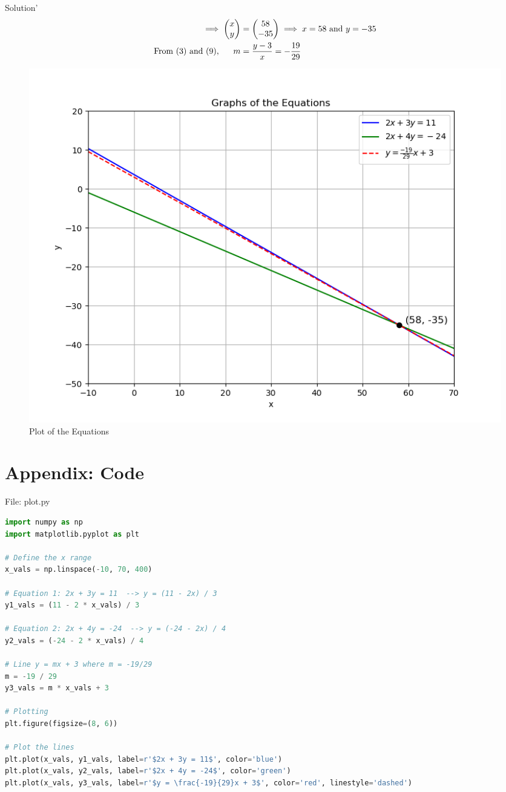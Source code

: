 \documentclass{beamer}
\numberwithin{equation}{section}
\theoremstyle{remark}
\newcommand{\myvec}[1]{\ensuremath{\begin{pmatrix}#1\end{pmatrix}}}
\begin{document}
\begin{frame}{Solution}'
\begin{align}
    \implies \myvec{x\\y} &= \myvec{58\\-35} \implies x = 58 \text{ and } y = -35 \\
    \text{From (3) and (9),}\hspace{0.6cm}m &= \frac{y - 3}{x} = -\frac{19}{29}
\end{align}
\begin{figure}[h!]
   \centering
   \includegraphics[width=0.64\linewidth]{figs/01.png}
   \caption{Plot of the Equations}
   \label{Plot_1}
\end{figure}
\end{frame}
\section*{Appendix: Code}
\begin{frame}[fragile]{File: plot.py}
\begin{lstlisting}[language=Python]
import numpy as np
import matplotlib.pyplot as plt

# Define the x range
x_vals = np.linspace(-10, 70, 400)

# Equation 1: 2x + 3y = 11  --> y = (11 - 2x) / 3
y1_vals = (11 - 2 * x_vals) / 3

# Equation 2: 2x + 4y = -24  --> y = (-24 - 2x) / 4
y2_vals = (-24 - 2 * x_vals) / 4

# Line y = mx + 3 where m = -19/29
m = -19 / 29
y3_vals = m * x_vals + 3

# Plotting
plt.figure(figsize=(8, 6))

# Plot the lines
plt.plot(x_vals, y1_vals, label=r'$2x + 3y = 11$', color='blue')
plt.plot(x_vals, y2_vals, label=r'$2x + 4y = -24$', color='green')
plt.plot(x_vals, y3_vals, label=r'$y = \frac{-19}{29}x + 3$', color='red', linestyle='dashed')
\end{lstlisting}
\end{frame}
\end{document}
